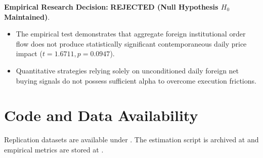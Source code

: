 \documentclass{article}
\begin{document}
\noindent \textbf{Empirical Research Decision:} \textbf{REJECTED (Null Hypothesis $H_0$ Maintained)}.
\begin{itemize}
    \item The empirical test demonstrates that aggregate foreign institutional order flow does not produce statistically significant contemporaneous daily price impact ($t = 1.6711, p = 0.0947$).
    \item Quantitative strategies relying solely on unconditioned daily foreign net buying signals do not possess sufficient alpha to overcome execution frictions.
\end{itemize}

\section*{Code and Data Availability}
Replication datasets are available under . The estimation script is archived at  and empirical metrics are stored at .



\end{document}
